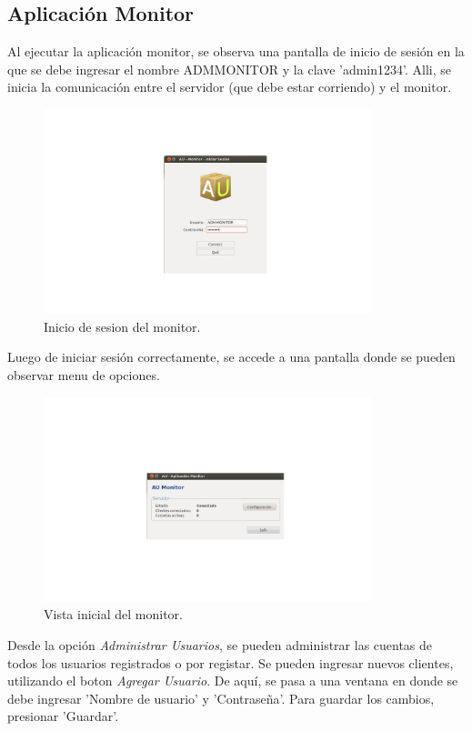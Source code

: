 \documentclass{article}
\begin{document}
\subsection{Aplicación Monitor}
\smallskip
	Al ejecutar la aplicación monitor, se observa una pantalla de inicio de sesión en la que se debe ingresar el nombre ADMMONITOR y la clave 'admin1234'. Alli, se inicia la comunicación entre el servidor (que debe estar corriendo) y el monitor.
	\begin{figure}[h]
       \centering
       \includegraphics[width=0.85\textwidth]{InicioMonitor.png}
	\bigskip
       \caption{Inicio de sesion del monitor.}
	\end{figure}
	Luego de iniciar sesión correctamente, se accede a una pantalla donde se pueden observar menu de opciones.
	\begin{figure}[h]
       \centering
       \includegraphics[width=0.85\textwidth]{MonitorPPal.png}
	\bigskip
       \caption{Vista inicial del monitor.}
	\end{figure}
	Desde la opción \textit{Administrar Usuarios}, se pueden administrar las cuentas de todos los usuarios registrados o por registar. Se pueden ingresar nuevos clientes, utilizando el boton \textit{Agregar Usuario}. De aquí, se pasa a una ventana en donde se debe ingresar 'Nombre de usuario' y 'Contraseña'. Para guardar los cambios, presionar 'Guardar'.
\end{document}
